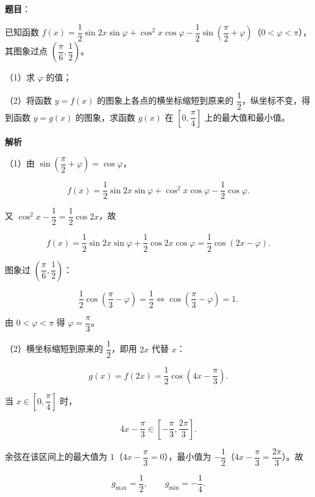 \begin{answer}

\textbf{题目}：

已知函数 $f(x)=\dfrac12\sin2x\sin\varphi+\cos^2x\cos\varphi-\dfrac12\sin\left(\dfrac\pi2+\varphi\right)$（$0<\varphi<\pi$），其图象过点 $\left(\dfrac\pi6,\dfrac12\right)$。

（1）求 $\varphi$ 的值；

（2）将函数 $y=f(x)$ 的图象上各点的横坐标缩短到原来的 $\dfrac12$，纵坐标不变，得到函数 $y=g(x)$ 的图象，求函数 $g(x)$ 在 $\left[0,\dfrac\pi4\right]$ 上的最大值和最小值。

\textbf{解析}

（1）由 $\sin\left(\dfrac\pi2+\varphi\right)=\cos\varphi$，

\nopagebreak[4]
\[f(x)=\frac12\sin2x\sin\varphi+\cos^2x\cos\varphi-\frac12\cos\varphi.\]

又 $\cos^2x-\dfrac12=\dfrac12\cos2x$，故

\nopagebreak[4]
\[f(x)=\frac12\sin2x\sin\varphi+\frac12\cos2x\cos\varphi
=\frac12\cos(2x-\varphi).\]

图象过 $\left(\dfrac\pi6,\dfrac12\right)$：

\nopagebreak[4]
\[\frac12\cos\left(\frac\pi3-\varphi\right)=\frac12
\iff \cos\left(\frac\pi3-\varphi\right)=1.\]

由 $0<\varphi<\pi$ 得 $\varphi=\dfrac\pi3$。

（2）横坐标缩短到原来的 $\dfrac12$，即用 $2x$ 代替 $x$：

\nopagebreak[4]
\[g(x)=f(2x)=\frac12\cos\left(4x-\frac\pi3\right).\]

当 $x\in\left[0,\dfrac\pi4\right]$ 时，

\nopagebreak[4]
\[4x-\frac\pi3\in\left[-\frac\pi3,\frac{2\pi}3\right].\]

余弦在该区间上的最大值为 $1$（$4x-\dfrac\pi3=0$），最小值为 $-\dfrac12$（$4x-\dfrac\pi3=\dfrac{2\pi}3$）。故

\nopagebreak[4]
\[g_{\max}=\frac12,\qquad g_{\min}=-\frac14.\]


\end{answer}

